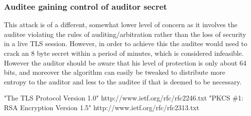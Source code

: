 \documentclass[10pt,a4paper]{article}
\begin{document}
\subsubsection{Auditee gaining control of auditor secret}
This attack is of a different, somewhat lower level of concern as it involves the auditee violating the rules of auditing/arbitration rather than the loss of security in a live TLS session. However, in order to achieve this the auditee would need to crack an 8 byte secret within a period of minutes, which is considered infeasible. However the auditor should be aware that his level of protection is only about 64 bits, and moreover the algorithm can easily be tweaked to distribute more entropy to the auditor and less to the auditee if that is deemed to be necessary.

\pagebreak

 \begin{thebibliography}{1}

   "The TLS Protocol Version 1.0" http://www.ietf.org/rfc/rfc2246.txt
   "PKCS \#1: RSA Encryption Version 1.5" \newline http://www.ietf.org/rfc/rfc2313.txt

  \end{thebibliography}
  
\end{document}
